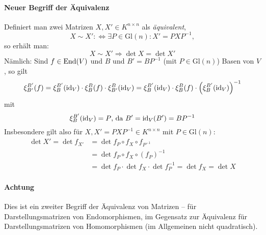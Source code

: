 \paragraph{Neuer Begriff der Äquivalenz}
	Definiert man zwei Matrizen $ X,X' \in K^{n\times n}$ als \emph{äquivalent},
		\[ X\sim X' :\Leftrightarrow \exists P\in \mathrm{Gl}(n): X' =PXP^{-1}, \]
	so erhält man:
		\[ X\sim X' \Rightarrow \det X = \det X' \]
	Nämlich: Sind $ f\in \operatorname{End}(V) $ und $ B $ und $ B'=BP^{-1} $ (mit $ P\in \mathrm{Gl}(n) $) Basen von $ V $, so gilt
		\[ \xi_{B'}^{B'}(f) = \xi_{B}^{B'}(\operatorname{id}_V)\cdot \xi_B^B(f)\cdot \xi_{B'}^{B}(\operatorname{id}_V) =
		\xi_{B}^{B'}(\operatorname{id}_V)\cdot \xi_B^B(f)\cdot \left(\xi^{B'}_{B}(\operatorname{id}_V)\right)^{-1} \]
	mit
		\[ \xi_B^{B'}(\operatorname{id}_V) = P \text{, da } B' = \operatorname{id}_V(B') = BP^{-1} \]
	Insbesondere gilt also für $ X,X' = PXP^{-1}\in K^{n\times n} $ mit $ P\in \mathrm{Gl}(n) $:
		\begin{align*} 
		\det X' = \det f_{X'} &= \det f_P \circ f_X \circ f_{P^{-1}} \\
		& =\det f_P \circ f_X \circ (f_P)^{-1}\\
		& = \det f_P \cdot \det f_X \cdot \det f_P^{-1} = \det f_X = \det X
		\end{align*}
\paragraph{Achtung}
	Dies ist ein zweiter Begriff der Äquivalenz von Matrizen -- für Darstellungsmatrizen von Endomorphismen, im Gegensatz zur Äquivalenz für Darstellungsmatrizen von Homomorphismen (im Allgemeinen nicht quadratisch).